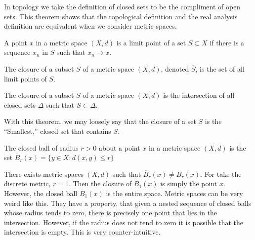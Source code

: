 \documentclass[crop=false,class=article,oneside]{standalone}
\begin{document}
            In topology we take the definition of
            closed sets to be the compliment of open
            sets. This theorem shows that the
            topological definition and the real analysis
            definition are equivalent when we consider
            metric spaces.
            \begin{definition}
                A point $x$ in a metric space
                $(X,d)$ is a limit point of a set
                $S\subset{X}$ if there is a sequence
                $x_{n}$ in $S$ such that
                $x_{n}\rightarrow{x}$.
            \end{definition}
            \begin{definition}
                The closure of a subset
                $S$ of a metric space
                $(X,d)$, denoted $\overline{S}$,
                is the set of all
                limit points of $S$.
            \end{definition}
            \begin{theorem}
                The closure of a subset
                $S$ of a metric space $(X,d)$
                is the intersection of all
                closed sets $\Delta$ such that
                $S\subset{\Delta}$.
            \end{theorem}
            With this theorem, we may loosely say that
            the closure of a set $S$ is the
            ``Smallest,'' closed set that contains $S$.
            \begin{definition}
                The closed ball of radius $r>0$ about
                a point $x$ in a metric space
                $(X,d)$ is the set
                $\overline{B}_{r}(x)%
                 =\{y\in{X}:d(x,y)\leq{r}\}$
            \end{definition}
            There exists metric spaces $(X,d)$
            such that
            $\overline{B}_{r}(x)\ne\overline{B_{r}(x)}$.
            For take the discrete metric, $r=1$.
            Then the closure of $B_{1}(x)$ is simply
            the point $x$. However, the closed ball
            $\overline{B}_{1}(x)$ is the entire space.
            Metric spaces can be very weird like this.
            They have a property, that given a nested
            sequence of closed balls whose radius
            tends to zero, there is precisely one
            point that lies in the intersection. However,
            if the radius does not tend to zero it is
            possible that the intersection is empty.
            This is very counter-intuitive.
\end{document}
